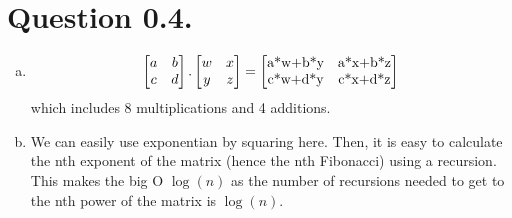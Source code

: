     \section{Question 0.4.}\label{sec:question-4}
    \begin{enumerate}[(a)]
        \item
        \[
            \begin{bmatrix}
                a & b \\
                c & d \\
            \end{bmatrix}
            .
            \begin{bmatrix}
                w & x \\
                y & z \\
            \end{bmatrix}
            =
            \begin{bmatrix}
                $a*w+b*y$ & $a*x+b*z$ \\
                $c*w+d*y$ & $c*x+d*z$ \\
            \end{bmatrix}
        \]
        which includes 8 multiplications and 4 additions.

        \item
        We can easily use exponentian by squaring here.\cite{ExponentiationSquaring2022}
        Then, it is easy to calculate the nth exponent of the
        matrix (hence the nth Fibonacci) using a recursion. This makes the big O $\log(n)$ as the number of recursions
        needed to get to the nth power of the matrix is $\log(n)$.

    \end{enumerate}


